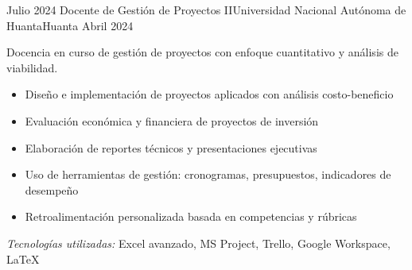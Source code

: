 \experience
{Julio 2024} {Docente de Gestión de Proyectos II}{Universidad Nacional Autónoma de Huanta}{Huanta}
{Abril 2024} {
	Docencia en curso de gestión de proyectos con enfoque cuantitativo y análisis de viabilidad.
	\begin{itemize}
		\item Diseño e implementación de proyectos aplicados con análisis costo-beneficio
		\item Evaluación económica y financiera de proyectos de inversión
		\item Elaboración de reportes técnicos y presentaciones ejecutivas
		\item Uso de herramientas de gestión: cronogramas, presupuestos, indicadores de desempeño
		\item Retroalimentación personalizada basada en competencias y rúbricas
	\end{itemize}
}
{\footnotesize{\emph{Tecnologías utilizadas:} Excel avanzado, MS Project, Trello, Google Workspace, LaTeX}}
